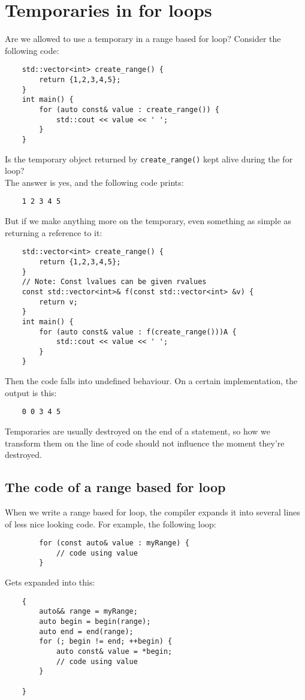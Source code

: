 \documentclass{report}
\title{\Huge{}}
\author{\huge{Matt Warner}}
\date{\huge{}}
\begin{document}
    \maketitle
    \section{Temporaries in for loops}
    Are we allowed to use a temporary in a range based for loop? Consider the following code:
    \begin{verbatim}
    std::vector<int> create_range() {
        return {1,2,3,4,5};
    } 
    int main() {
        for (auto const& value : create_range()) {
            std::cout << value << ' ';
        }
    }
    \end{verbatim}
    Is the temporary object returned by \texttt{create\_range()} kept alive during the for loop? \vspace{1.5mm} \\ The answer is yes, and the following code prints:
    \begin{verbatim}
    1 2 3 4 5 
    \end{verbatim}
    But if we make anything more on the temporary, even something as simple as returning a reference to it:
    \begin{verbatim}
    std::vector<int> create_range() {
        return {1,2,3,4,5};
    } 
    // Note: Const lvalues can be given rvalues
    const std::vector<int>& f(const std::vector<int> &v) {
        return v;
    }
    int main() {
        for (auto const& value : f(create_range()))A {
            std::cout << value << ' ';
        }
    }
    \end{verbatim}
    Then the code falls into undefined behaviour. On a certain implementation, the output is this:
    \begin{verbatim}
    0 0 3 4 5 
    \end{verbatim}
    Temporaries are usually destroyed on the end of a statement, so how we transform them on the line of code should not influence the moment they're destroyed.
    \bigbreak \noindent
    \subsection{The code of a range based for loop}
    When we write a range based for loop, the compiler expands it into several lines of less nice looking code. \bigbreak \noindent
    For example, the following loop:
    \begin{verbatim}
        for (const auto& value : myRange) {
            // code using value
        }
    \end{verbatim}
    Gets expanded into this:
    \begin{verbatim}
    {
        auto&& range = myRange; 
        auto begin = begin(range);
        auto end = end(range);
        for (; begin != end; ++begin) {
            auto const& value = *begin;
            // code using value
        }

    }
    \end{verbatim}
\end{document}

